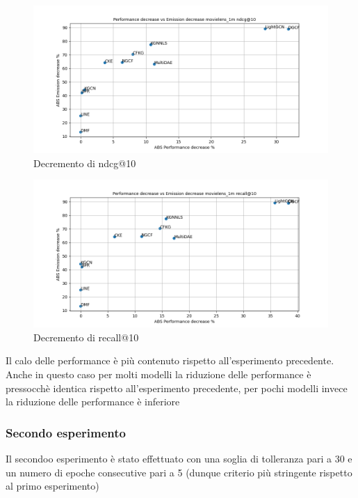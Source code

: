 \begin{figure}[H]
    \centering
    \includegraphics[scale=0.5]{images/decrement_ndcg@10_movielens_1m_40_5.png}
    \caption{Decremento di ndcg@10}
\end{figure}

\begin{figure}[H]
    \centering
    \includegraphics[scale=0.5]{images/decrement_recall@10_movielens_1m_40_5.png}
    \caption{Decremento di recall@10}
\end{figure}
\noindent Il calo delle performance è più contenuto rispetto all'esperimento precedente. Anche in questo caso per molti modelli la riduzione delle performance è pressocchè identica rispetto all'esperimento precedente, per pochi modelli invece la riduzione delle performance è inferiore


\subsubsection{Secondo esperimento}
Il secondoo esperimento è stato effettuato con una soglia di tolleranza pari a 30 e un numero di epoche consecutive pari a 5 (dunque criterio più stringente rispetto al primo esperimento)

